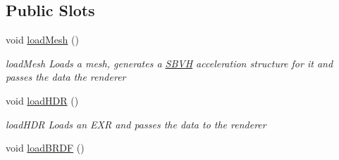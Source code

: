 \subsection*{Public Slots}
\begin{DoxyCompactItemize}
\item 
\hypertarget{classNGLScene_aa484c5103aa3829f0495f13bc8fb8482}{void \hyperlink{classNGLScene_aa484c5103aa3829f0495f13bc8fb8482}{load\-Mesh} ()}\label{classNGLScene_aa484c5103aa3829f0495f13bc8fb8482}

\begin{DoxyCompactList}\small\item\em load\-Mesh Loads a mesh, generates a \hyperlink{classSBVH}{S\-B\-V\-H} acceleration structure for it and passes the data the renderer \end{DoxyCompactList}\item 
\hypertarget{classNGLScene_a954a5eb1691e9828aed8d180a42575eb}{void \hyperlink{classNGLScene_a954a5eb1691e9828aed8d180a42575eb}{load\-H\-D\-R} ()}\label{classNGLScene_a954a5eb1691e9828aed8d180a42575eb}

\begin{DoxyCompactList}\small\item\em load\-H\-D\-R Loads an E\-X\-R and passes the data to the renderer \end{DoxyCompactList}\item 
\hypertarget{classNGLScene_a6efc515d291011cd581480a4a4916e5c}{void \hyperlink{classNGLScene_a6efc515d291011cd581480a4a4916e5c}{load\-B\-R\-D\-F} ()}\label{classNGLScene_a6efc515d291011cd581480a4a4916e5c}


\end{DoxyCompactItemize}
